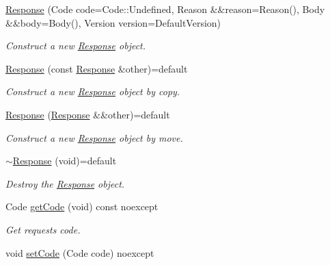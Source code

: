 \begin{DoxyCompactItemize}
\item 
\mbox{\hyperlink{classo_z_1_1o_z_1_1_h_t_t_p_1_1_response_aa5b5d0b822053603c5fde6e301e1ca67}{Response}} (Code code=Code\+::\+Undefined, Reason \&\&reason=Reason(), Body \&\&body=Body(), Version version=Default\+Version)
\begin{DoxyCompactList}\small\item\em Construct a new \mbox{\hyperlink{classo_z_1_1o_z_1_1_h_t_t_p_1_1_response}{Response}} object. \end{DoxyCompactList}\item 
\mbox{\hyperlink{classo_z_1_1o_z_1_1_h_t_t_p_1_1_response_a0a0c84d1d4e5aa1574e18d84f5daba4e}{Response}} (const \mbox{\hyperlink{classo_z_1_1o_z_1_1_h_t_t_p_1_1_response}{Response}} \&other)=default
\begin{DoxyCompactList}\small\item\em Construct a new \mbox{\hyperlink{classo_z_1_1o_z_1_1_h_t_t_p_1_1_response}{Response}} object by copy. \end{DoxyCompactList}\item 
\mbox{\hyperlink{classo_z_1_1o_z_1_1_h_t_t_p_1_1_response_afc44351c01bb3eca89add0bd80ae4995}{Response}} (\mbox{\hyperlink{classo_z_1_1o_z_1_1_h_t_t_p_1_1_response}{Response}} \&\&other)=default
\begin{DoxyCompactList}\small\item\em Construct a new \mbox{\hyperlink{classo_z_1_1o_z_1_1_h_t_t_p_1_1_response}{Response}} object by move. \end{DoxyCompactList}\item 
\mbox{\hyperlink{classo_z_1_1o_z_1_1_h_t_t_p_1_1_response_af10558b9369565cacb87605feb4f1893}{$\sim$\+Response}} (void)=default
\begin{DoxyCompactList}\small\item\em Destroy the \mbox{\hyperlink{classo_z_1_1o_z_1_1_h_t_t_p_1_1_response}{Response}} object. \end{DoxyCompactList}\item 
Code \mbox{\hyperlink{classo_z_1_1o_z_1_1_h_t_t_p_1_1_response_aacfdfb400c4c7e8f46a6b7967b9e174f}{get\+Code}} (void) const noexcept
\begin{DoxyCompactList}\small\item\em Get request\textquotesingle{}s code. \end{DoxyCompactList}\item 
void \mbox{\hyperlink{classo_z_1_1o_z_1_1_h_t_t_p_1_1_response_a51376697ae2fdc23bc8d6eb3cb398920}{set\+Code}} (Code code) noexcept

\end{DoxyCompactItemize}
